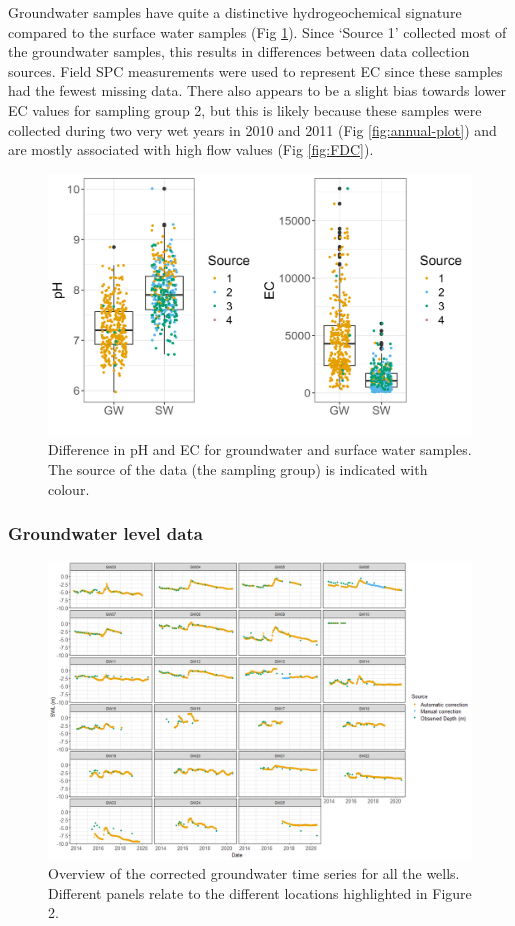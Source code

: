 \documentclass[, manuscript]{copernicus}
\begin{document}
Groundwater samples have quite a distinctive hydrogeochemical signature
compared to the surface water samples (Fig \ref{fig:gw_sw-plot}). Since
`Source 1' collected most of the groundwater samples, this results in
differences between data collection sources. Field SPC measurements were
used to represent EC since these samples had the fewest missing data.
There also appears to be a slight bias towards lower EC values for
sampling group 2, but this is likely because these samples were
collected during two very wet years in 2010 and 2011 (Fig
\ref{fig:annual-plot}) and are mostly associated with high flow values
(Fig \ref{fig:FDC}).

\begin{figure}
\includegraphics[width=0.8\linewidth]{Figures/gwsw} \caption{Difference in pH and EC for groundwater and surface water samples. The source of the data (the sampling group) is indicated with colour.}\label{fig:gw_sw-plot}
\end{figure}

\subsubsection{Groundwater level data}

\begin{figure}
\includegraphics[width=1\linewidth]{Figures/Final_Corrected_piezodepths} \caption{Overview of the corrected groundwater time series for all the wells. Different panels relate to the different locations highlighted in Figure 2.}\label{fig:gw-series}
\end{figure}
\end{document}
